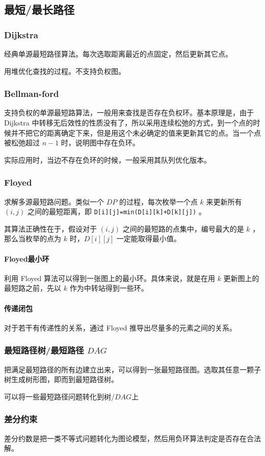\documentclass[UTF-8]{ctexart}
\begin{document}
			\subsection{最短/最长路径}
				\subsubsection{Dijkstra}
				经典单源最短路径算法。每次选取距离最近的点固定，然后更新其它点。
				
				用堆优化查找的过程。不支持负权图。
				\subsubsection{Bellman-ford}
				支持负权的单源最短路算法，一般用来查找是否存在负权环。基本原理是，由于 Dijkstra 中转移无后效性的性质没有了，所以采用连续松弛的方式，到一个点的时候并不把它的距离确定下来，但是用这个未必确定的值来更新其它的点。当一个点被松弛超过 $n-1$ 时，说明图中存在负环。
				
				实际应用时，当边不存在负环的时候，一般采用其队列优化版本。
				\subsubsection{Floyed}
				求解多源最短路问题。类似一个 $DP$ 的过程，每次枚举一个点 $k$ 来更新所有 $(i,j)$ 之间的最短距离，即 \texttt{D[i][j]=min(D[i][k]+D[k][j])} 。
				
				其算法正确性在于，假设对于 $(i,j)$ 之间的最短路的点集中，编号最大的是 $k$ ，那么当枚举的点为 $k$ 时，$D[i][j]$ 一定能取得最小值。
				\paragraph{Floyed最小环} 利用 Floyed 算法可以得到一张图上的最小环。具体来说，就是在用 $k$ 更新图上的最短路之前，先以 $k$ 作为中转站得到一些环。
				\paragraph{传递闭包} 对于若干有传递性的关系，通过 Floyed 推导出尽量多的元素之间的关系。
				\subsubsection{最短路径树/最短路径 $DAG$}
				把满足最短路径的所有边建立出来，可以得到一张最短路径图。选取其任意一颗子树生成树形图，即而到最短路径树。
				
				可以将一些最短路径问题转化到树/$DAG$上
				\subsubsection{差分约束}
				差分约数是把一类不等式问题转化为图论模型，然后用负环算法判定是否存在合法解。
\end{document}
